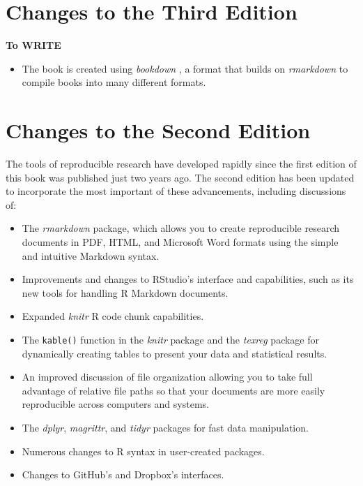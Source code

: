 \documentclass[]{krantz}
\providecommand{\tightlist}{%
  \setlength{\itemsep}{0pt}\setlength{\parskip}{0pt}}
\theoremstyle{definition}
\theoremstyle{definition}
\theoremstyle{definition}
\theoremstyle{remark}
\begin{document}
\hypertarget{changes-to-the-third-edition}{%
\section*{Changes to the Third
Edition}\label{changes-to-the-third-edition}}


\textbf{To WRITE}

\begin{itemize}
\tightlist
\item
  The book is created using \emph{bookdown} \citep{R-bookdown}, a format
  that builds on \emph{rmarkdown} to compile books into many different
  formats.
\end{itemize}

\hypertarget{changes-to-the-second-edition}{%
\section*{Changes to the Second
Edition}\label{changes-to-the-second-edition}}


The tools of reproducible research have developed rapidly since the
first edition of this book was published just two years ago. The second
edition has been updated to incorporate the most important of these
advancements, including discussions of:

\begin{itemize}
\item
  The \emph{rmarkdown} package, which allows you to create reproducible
  research documents in PDF, HTML, and Microsoft Word formats using the
  simple and intuitive Markdown syntax.
\item
  Improvements and changes to RStudio's interface and capabilities, such
  as its new tools for handling R Markdown documents.
\item
  Expanded \emph{knitr} R code chunk capabilities.
\item
  The \texttt{kable()} function in the \emph{knitr} package and the
  \emph{texreg} package for dynamically creating tables to present your
  data and statistical results.
\item
  An improved discussion of file organization allowing you to take full
  advantage of relative file paths so that your documents are more
  easily reproducible across computers and systems.
\item
  The \emph{dplyr}, \emph{magrittr}, and \emph{tidyr} packages for fast
  data manipulation.
\item
  Numerous changes to R syntax in user-created packages.
\item
  Changes to GitHub's and Dropbox's interfaces.
\end{itemize}
\end{document}
